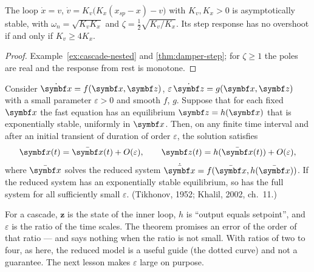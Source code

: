 \begin{theorem}
\label{thm:cascade-nested}
The loop $\dot x = v$, $\dot v = K_v\big(K_x(x_{sp} - x) - v\big)$ with $K_v, K_x > 0$ is asymptotically stable, with $\omega_n = \sqrt{K_vK_x}$ and $\zeta = \tfrac12\sqrt{K_v/K_x}$. Its step response has no overshoot if and only if $K_v \ge 4K_x$.
\end{theorem}
\begin{proof}
Example~\ref{ex:cascade-nested} and \cref{thm:damper-step}; for $\zeta \ge 1$ the poles are real and the response from rest is monotone.
\end{proof}

\begin{theorem}
\label{thm:cascade-tikhonov}
Consider $\dot{\vx} = f(\vx, \symbf z)$, $\varepsilon\,\dot{\symbf z} = g(\vx, \symbf z)$ with a small parameter $\varepsilon > 0$ and smooth $f$, $g$. Suppose that for each fixed $\vx$ the fast equation has an equilibrium $\symbf z = h(\vx)$ that is exponentially stable, uniformly in $\vx$. Then, on any finite time interval and after an initial transient of duration of order $\varepsilon$, the solution satisfies
\begin{equation*}
  \vx(t) = \bar{\vx}(t) + O(\varepsilon), \qquad \symbf z(t) = h(\bar{\vx}(t)) + O(\varepsilon),
\end{equation*}
where $\bar{\vx}$ solves the reduced system $\dot{\bar{\vx}} = f(\bar{\vx}, h(\bar{\vx}))$. If the reduced system has an exponentially stable equilibrium, so has the full system for all sufficiently small $\varepsilon$. (Tikhonov, 1952; Khalil, 2002, ch.~11.)
\end{theorem}

For a cascade, $\symbf z$ is the state of the inner loop, $h$ is \enquote{output equals setpoint}, and $\varepsilon$ is the ratio of the time scales. The theorem promises an error of the order of that ratio — and says nothing when the ratio is not small. With ratios of two to four, as here, the reduced model is a useful guide (the dotted curve) and not a guarantee. The next lesson makes $\varepsilon$ large on purpose.

